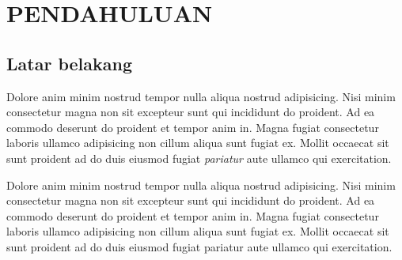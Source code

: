 
\chapter{PENDAHULUAN}\label{bab1}

\section{Latar belakang}\label{latarbelakang}

Dolore anim minim nostrud tempor nulla aliqua nostrud adipisicing. Nisi minim consectetur magna non sit excepteur sunt qui incididunt do proident. Ad ea commodo deserunt do proident et tempor anim in. Magna fugiat consectetur laboris ullamco adipisicing non cillum aliqua sunt fugiat ex. Mollit occaecat sit sunt proident ad do duis eiusmod fugiat \emph{pariatur} aute ullamco qui exercitation.

Dolore anim minim nostrud tempor nulla aliqua nostrud adipisicing. Nisi minim consectetur magna non sit excepteur sunt qui incididunt do proident. Ad ea commodo deserunt do proident et tempor anim in. Magna fugiat consectetur laboris ullamco adipisicing non cillum aliqua sunt fugiat ex. Mollit occaecat sit sunt proident ad do duis eiusmod fugiat pariatur aute ullamco qui exercitation.
